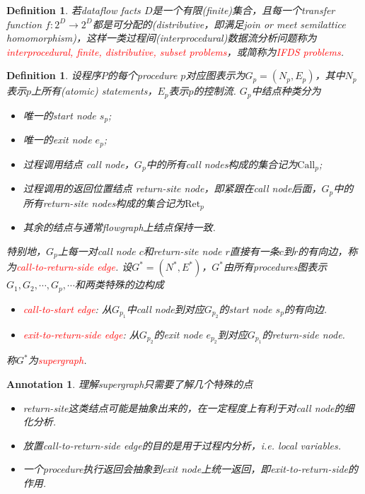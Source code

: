 \documentclass{article}
\newtheorem{definition}[theorem]{Definition}
\newtheorem{annotation}[theorem]{Annotation}
\newcommand*{\xfunc}[4]{{#2}\colon{#3}{#1}{#4}}
\newcommand*{\func}[3]{\xfunc{\to}{#1}{#2}{#3}}
\newcommand{\redt}[1]{\textcolor{red}{#1}}
\begin{document}
\begin{definition}
\rm 若dataflow facts $D$是一个有限(finite)集合，且每一个transfer function $\func{f}{2^D}{2^D}$都是可分配的(distributive，即满足join or meet semilattice homomorphism)，这样一类过程间(interprocedural)数据流分析问题称为\redt{interprocedural, finite, distributive, subset problems}，或简称为\redt{IFDS problems}.
\end{definition}

\begin{definition}
\rm 设程序$P$的每个procedure $p$对应图表示为$G_p=(N_p, E_p)$，其中$N_p$表示$p$上所有(atomic) statements，$E_p$表示$p$的控制流. $G_p$中结点种类分为
\begin{itemize}
	\item 唯一的start node $s_p$;
	\item 唯一的exit node $e_p$;
	\item 过程调用结点 call node，$G_p$中的所有call nodes构成的集合记为$\text{Call}_p$;
	\item 过程调用的返回位置结点 return-site node，即紧跟在call node后面，$G_p$中的所有return-site nodes构成的集合记为$\text{Ret}_p$
	\item 其余的结点与通常flowgraph上结点保持一致. 
\end{itemize}
特别地，$G_p$上每一对call node $c$和return-site node $r$直接有一条$c$到$r$的有向边，称为\redt{call-to-return-side edge}. 设$G^*=(N^*,E^*)$，$G^*$由所有procedures图表示$G_1,G_2,\cdots,
G_p,\cdots$和两类特殊的边构成
\begin{itemize}
	\item \redt{call-to-start edge}: 从$G_{p_1}$中call node到对应$G_{p_2}$的start node $s_p$的有向边.
	\item \redt{exit-to-return-side edge}: 从$G_{p_2}$的exit node $e_{p_2}$到对应$G_{p_1}$的return-side node. 
\end{itemize}
称$G^*$为\redt{supergraph}.
\end{definition}


\begin{annotation}
\rm 理解supergraph只需要了解几个特殊的点
\begin{itemize}
	\item return-site这类结点可能是抽象出来的，在一定程度上有利于对call node的细化分析.
	\item 放置call-to-return-side edge的目的是用于过程内分析，i.e. local variables.
	\item 一个procedure执行返回会抽象到exit node上统一返回，即exit-to-return-side的作用.
\end{itemize} 
\end{annotation}
\end{document}
